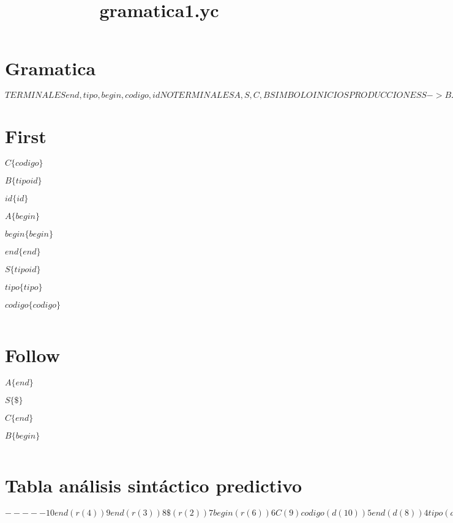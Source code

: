 \documentclass {article}
\begin{document}
 

\title{gramatica1.yc}
\maketitle
\section{Gramatica}
$
TERMINALES
	end,tipo,begin,codigo,id
NO TERMINALES
	A,S,C,B
SIMBOLO INICIO
	S
PRODUCCIONES
S->B A end 
A->begin C 
C->codigo 
B->tipo 
B->id B $

\section{First}
$
C\{codigo\}$

$
B\{tipo id\}$

$
id\{id\}$

$
A\{begin\}$

$
begin\{begin\}$

$
end\{end\}$

$
S\{tipo id\}$

$
tipo\{tipo\}$

$
codigo\{codigo\}$

$
$

\section{Follow}
$
A\{end\}$

$
S\{\$\}$

$
C\{end\}$

$
B\{begin\}$

$
$

\section{Tabla análisis sintáctico predictivo}
$
-----
10
	end(r(4))
9
	end(r(3))
8
	\$(r(2))
7
	begin(r(6))
6
	C(9)	codigo(d(10))
5
	end(d(8))
4
	tipo(d(3))	B(7)	id(d(4))
3
	begin(r(5))
2
	A(5)	begin(d(6))
1
	\$(ACP)
0
	S(1)	tipo(d(3))	B(2)	id(d(4))
-----$
\end{document}
